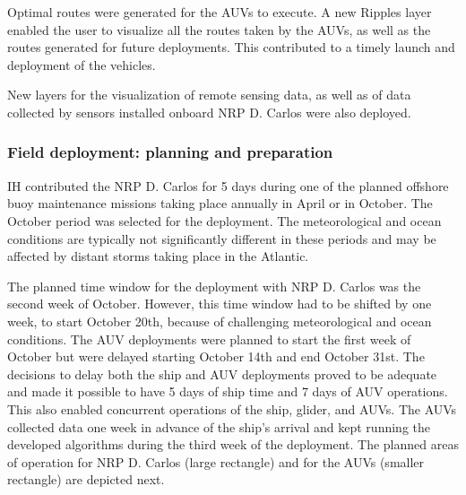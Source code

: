  
Optimal routes were generated for the AUVs to execute. A new Ripples
layer enabled the user to visualize all the routes taken by the AUVs, as
well as the routes generated for future deployments. This contributed to
a timely launch and deployment of the vehicles.
 
New layers for the visualization of remote sensing data, as well as of
data collected by sensors installed onboard NRP D. Carlos were also
deployed.



\subsubsection{Field deployment: planning and preparation}

IH contributed the NRP D. Carlos for 5 days during one of the planned
offshore buoy maintenance missions taking place annually in April or in
October. The October period was selected for the \proj deployment. The
meteorological and ocean conditions are typically not significantly
different in these periods and may be affected by distant storms taking
place in the Atlantic.

The planned time window for the \proj deployment with NRP D. Carlos was
the second week of October. However, this time window had to be shifted
by one week, to start October 20th, because of challenging
meteorological and ocean conditions. The AUV deployments were planned to
start the first week of October but were delayed starting October 14th
and end October 31st. The decisions to delay both the ship and AUV
deployments proved to be adequate and made it possible to have 5 days of
ship time and 7 days of AUV operations. This also enabled concurrent
operations of the ship, glider, and AUVs. The AUVs collected data one
week in advance of the ship’s arrival and kept running the developed
algorithms during the third week of the deployment. The planned areas of
operation for NRP D. Carlos (large rectangle) and for the AUVs (smaller
rectangle) are depicted next.


